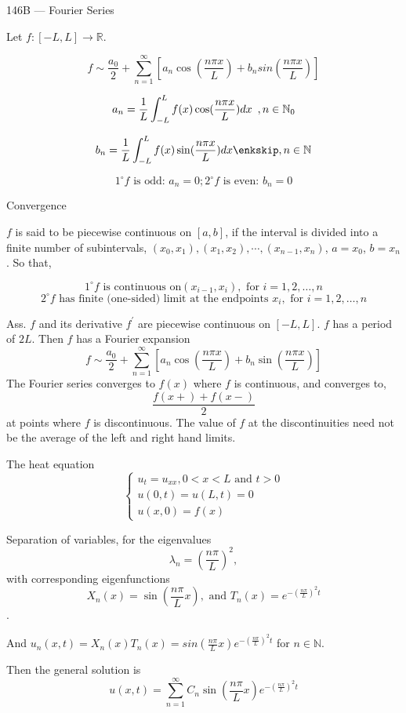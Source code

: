 \documentclass{article}
\newcommand\N{\mathbb{N}}
\newcommand\R{\mathbb{R}}
\begin{document}
\begin{center}
  146B --- Fourier Series
\end{center}\vspace{1.618em}

Let $f:[-L,L]\rightarrow \R$.

$$f \sim \frac{a_0}{2} + \sum_{n=1}^\infty [a_n \cos(\frac{n\pi x}{L}) +
b_n sin(\frac{n\pi x}{L})]$$

$$a_n = \frac{1}{L} \int_{-L}^L f(x)\cos(\frac{n\pi x}{L}) dx\enskip,
n\in \N_0$$

$$b_n = \frac{1}{L} \int_{-L}^L f(x)\sin(\frac{n\pi x}{L}) dx\enkskip,
n\in \N$$

$$1^\circ f\text{ is odd: } a_n = 0; 2^\circ f\text{ is even: } b_n = 0$$

Convergence

$f$ is said to be piecewise continuous on $[a,b]$, if the interval is
divided into a finite number of subintervals,
$(x_0,x_1),(x_1,x_2),\cdots,(x_{n-1},x_n)$, $a = x_0$, $b = x_n$. So
that,

$$1^\circ f\text{ is continuous on} (x_{i-1}, x_i),\text{ for } i =
1,2,\dots,n$$
$$2^\circ f\text{ has finite (one-sided) limit at the endpoints }
x_i,\text{ for } i = 1,2,\dots, n$$

Ass. $f$ and its derivative $f^\prime$ are piecewise continuous on
$[-L,L].$ $f$ has a period of $2L$. Then $f$ has a Fourier expansion
$$f \sim \frac{a_0}{2} + \sum_{n=1}^\infty [a_n \cos(\frac{n\pi x}{L}) +
b_n \sin(\frac{n\pi x}{L})]$$
The Fourier series converges to $f(x)$ where $f$ is continuous, and
converges to,$$\frac{f(x+)+f(x-)}{2}$$ at points where $f$ is
discontinuous. The value of $f$ at the discontinuities need not be the
average of the left and right hand limits.

The heat equation $$\begin{cases} u_t = u_{xx}, 0<x<L\text{ and }t>0\\
  u(0,t)= u(L,t) = 0 \\ u(x,0) = f(x)\end{cases}$$

Separation of variables, for the eigenvalues $$\lambda_n =
(\frac{n\pi}{L})^2,$$ with corresponding
eigenfunctions $$X_n(x) = \sin(\frac{n\pi}{L}x),\text{ and }T_n(x) =
e^{-(\frac{n\pi}{L})^2 t}$$.

And $u_n(x,t)= X_n(x)T_n(x) =
sin(\frac{n\pi}{L}x)e^{-(\frac{n\pi}{L})^2 t}$ for $n\in \N$.

Then the general solution is $$u(x,t) = \sum_{n=1}^\infty C_n
\sin(\frac{n\pi}{L}x)e^{-(\frac{n\pi}{L})^2 t}$$
\newpage
\end{document}
